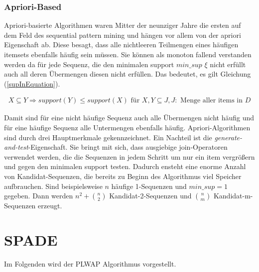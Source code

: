 \subsubsection{Apriori-Based}

Apriori-basierte Algorithmen waren Mitter der neunziger Jahre die ersten auf dem Feld des sequential pattern mining und hängen vor allem von der apriori Eigenschaft ab. Diese besagt, dass alle nichtleeren Teilmengen eines häufigen itemsets ebenfalls häufig sein müssen. Sie können als monoton fallend verstanden werden da für jede Sequenz, die den minimalen support $min\_sup$ $\xi$ nicht erfüllt auch all deren Übermengen diesen nicht erfüllen. Das bedeutet, es gilt Gleichung (\ref{supInEquation}).

\begin{align}
	X \subseteq Y \Rightarrow support(Y) \leq support(X) \text{  für  } X,Y \subseteq J, J: \text{  Menge aller items in  } D \label{supInEquation}
\end{align}

Damit sind für eine nicht häufige Sequenz auch alle Übermengen nicht häufig und für eine häufige Sequenz alle Untermengen ebenfalls häufig. Apriori-Algorithmen sind durch drei Hauptmerkmale gekennzeichnet.
Ein Nachteil ist die \textit{generate-and-test}-Eigenschaft. Sie bringt mit sich, dass ausgiebige join-Operatoren verwendet werden, die die Sequenzen in jedem Schritt um nur ein item vergrößern und gegen den minimalen support testen. Dadurch ensteht eine enorme Anzahl von Kandidat-Sequenzen, die bereits zu Beginn des Algorithmus viel Speicher aufbrauchen. Sind beispielsweise $n$ häufige 1-Sequenzen und $min\_sup=1$ gegeben. Dann werden $n^2+\binom{n}{2}$  Kandidat-2-Sequenzen und $\binom{n}{m}$ Kandidat-m-Sequenzen erzeugt.

\section{SPADE}
Im Folgenden wird der PLWAP Algorithmus \cite{plwap} vorgestellt.
